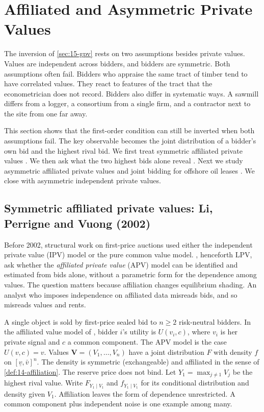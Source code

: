 \section{Affiliated and Asymmetric Private Values}\label{sec:15-apv}

The inversion of \cref{sec:15-gpv} rests on two assumptions besides private values. Values are
independent across bidders, and bidders are symmetric. Both assumptions often fail. Bidders who appraise
the same tract of timber tend to have correlated values. They react to features of the tract that the
econometrician does not record. Bidders also differ in systematic ways. A sawmill differs from a logger,
a consortium from a single firm, and a contractor next to the site from one far away.

This section shows that the first-order condition can still be inverted when both assumptions fail. The
key observable becomes the joint distribution of a bidder's own bid and the highest rival bid. We first
treat symmetric affiliated private values \citep{LiPerrigneVuong2002}. We then ask what the two highest
bids alone reveal \citep{AtheyHaile2002}. Next we study asymmetric affiliated private values and joint
bidding for offshore oil leases \citep{CampoPerrigneVuong2003}. We close with asymmetric independent
private values.

\subsection{Symmetric affiliated private values: Li, Perrigne and Vuong (2002)}\label{sec:15-apv-lpv}

 Before 2002, structural work on first-price auctions used either the independent
private value (IPV) model or the pure common value model. \citet{LiPerrigneVuong2002}, henceforth LPV, ask whether the
\emph{affiliated private value} (APV) model can be identified and estimated from bids alone, without a
parametric form for the dependence among values. The question matters because affiliation changes
equilibrium shading. An analyst who imposes independence on affiliated data misreads bids, and so
misreads values and rents.

 A single object is sold by first-price sealed bid to $n\ge2$ risk-neutral bidders. In the
affiliated value model of \citet{MilgromWeber1982}, bidder $i$'s utility is $U(v_i,c)$, where $v_i$ is
her private signal and $c$ a common component. The APV model is the case $U(v,c)=v$. Values
$\bm V=(V_1,\dots,V_n)$ have a joint distribution $F$ with density $f$ on $[\underline v,\bar v]^n$. The
density is symmetric (exchangeable) and affiliated in the sense of \cref{def:14-affiliation}. The reserve
price does not bind. Let $Y_1=\max_{j\ne1}V_j$ be the highest rival value. Write $F_{Y_1\mid V_1}$ and
$f_{Y_1\mid V_1}$ for its conditional distribution and density given $V_1$. Affiliation leaves the form of
dependence unrestricted. A common component plus independent noise is one example among many.

